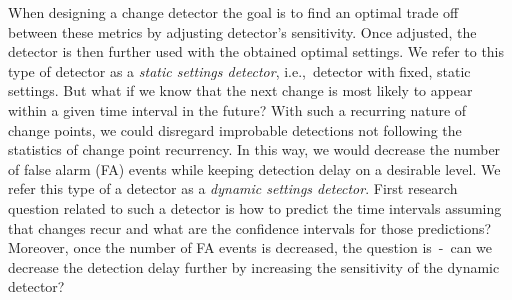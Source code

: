When designing a change detector the goal is to find an optimal trade off between these metrics by adjusting detector's sensitivity.
Once adjusted, the detector is %
then further used with the obtained optimal settings.
We refer to this type of detector as a \textit{static settings detector}, i.e.,\ detector with fixed, static settings.
But what if we know that the next change is most likely to appear within a given time interval in the future?
With such a recurring nature of change points, we could
disregard %
improbable detections not following the statistics of change point recurrency.
In this way, we would decrease the number of false alarm (FA) events while keeping detection delay on a desirable level.
We refer this type of a detector as a \textit{dynamic settings detector}.
First research question related to such a detector is how to predict the time intervals assuming that changes recur and what are the confidence intervals for those predictions?
Moreover, once the number of FA events is decreased, the question is\ -\ can we decrease the detection delay further by increasing the sensitivity of the dynamic detector?


